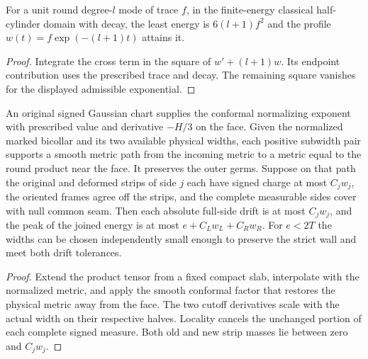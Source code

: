 \begin{proposition}
\label{prop:ed04-round-mode}
\leanok
For a unit round degree-$l$ mode of trace $f$, in the finite-energy
classical half-cylinder domain with decay, the least energy is
$6(l+1)f^2$ and the profile $w(t)=f\exp(-(l+1)t)$ attains it.
\end{proposition}
\begin{proof}
\leanok
Integrate the cross term in the square of $w'+(l+1)w$. Its endpoint
contribution uses the prescribed trace and decay. The remaining square
vanishes for the displayed admissible exponential.
\end{proof}

\begin{proposition}
\label{prop:ed04-physical-face}
\leanok
An original signed Gaussian chart supplies the conformal normalizing
exponent with prescribed value and derivative $-H/3$ on the face.
Given the normalized marked bicollar and its two available physical
widths, each positive subwidth pair supports a smooth metric path from
the incoming metric to a metric equal to the round product near the
face. It preserves the outer germs. Suppose on that path the original
and deformed strips of side $j$ each have signed charge at most
$C_jw_j$, the oriented frames agree off the strips, and the complete
measurable sides cover with null common seam. Then each absolute
full-side drift is at most $C_jw_j$, and the peak of the joined energy
is at most $e+C_Lw_L+C_Rw_R$. For $e<2T$ the widths can be chosen
independently small enough to preserve the strict wall and meet both
drift tolerances.
\end{proposition}
\begin{proof}
\leanok
Extend the product tensor from a fixed compact slab, interpolate with
the normalized metric, and apply the smooth conformal factor that
restores the physical metric away from the face. The two cutoff
derivatives scale with the actual width on their respective halves.
Locality cancels the unchanged portion of each complete signed measure.
Both old and new strip masses lie between zero and $C_jw_j$.
\end{proof}

